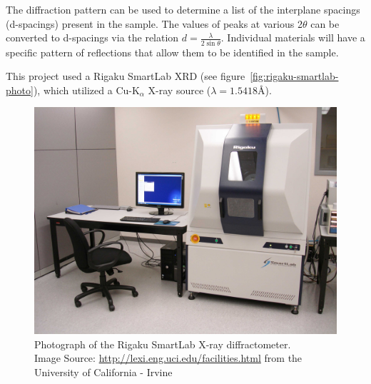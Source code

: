 The diffraction pattern can be used to determine a list of the interplane spacings (d-spacings) present in the sample. The values of peaks at various 2$\theta$ can be converted to d-spacings via the relation $d=\frac{\lambda}{2\sin\theta}$. Individual materials will have a specific pattern of reflections that allow them to be identified in the sample.\cite{giacovazzo_XRD_1992} 

This project used a Rigaku SmartLab XRD (see figure~\vref{fig:rigaku-smartlab-photo}), which utilized a Cu-K$_{\alpha}$ X-ray source ($\lambda = 1.5418$\AA).


\begin{figure}[tbp]
   \centering
   \includegraphics[width=0.75\linewidth]{./figures/characterization/rigaku-smartlab-photo.jpg} 
   \caption[Rigaku SmartLab XRD]%
   		{Photograph of the Rigaku SmartLab X-ray diffractometer.\\%
		{\tiny Image Source: \url{http://lexi.eng.uci.edu/facilities.html} from the University of California - Irvine%
		\cite{smartlab-image}}}
   \label{fig:rigaku-smartlab-photo}
\end{figure}



%


































	
	
	